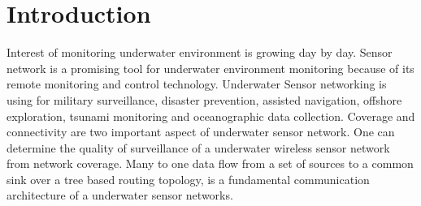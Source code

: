 \documentclass[12pt]{article}
\begin{document}
\newcommand {\nwline}   {\hfill\break}
\newcommand {\closeup}  {\vspace*{-0.2in}}
\newcommand {\hLine}[1] {\begin{center}\rule{#1}{0.25mm}\end{center}}

\newcommand {\ol}[1]    {\overline{#1}}
\newcommand{\Prob}[1]   { {\bf \mathrm{Prob}} \left[ #1 \right] }
\newcommand{\Var}[1]    { {\bf \mathrm{Var}} \left[ #1 \right] }



\begin{abstract}

\begin{comment}
Note that a paper's abstract is intended to be a concise highlevel
description of the contents of the paper. It implicitly defines a road
map of the important aspects of the paper (without referring to exact
section numbers) and it should do a good job in mentioning all such
important aspects in a coherent way.
\end{comment}
\end{abstract}

\section{Introduction}
\label{sec:intro}
Interest of monitoring underwater environment is growing day by day. Sensor network is a promising tool for underwater environment monitoring because of its remote monitoring and control technology. Underwater Sensor networking is using for military surveillance\cite{kong2005building}, disaster prevention, assisted navigation, offshore exploration, tsunami monitoring and oceanographic data collection. 
Coverage and connectivity are two important aspect of underwater sensor network. One can determine the quality of surveillance of a underwater wireless sensor network from network coverage. Many to one data flow from a set of sources to a common sink over a tree based routing topology, is a fundamental communication architecture of a underwater sensor networks.
\end{document}
